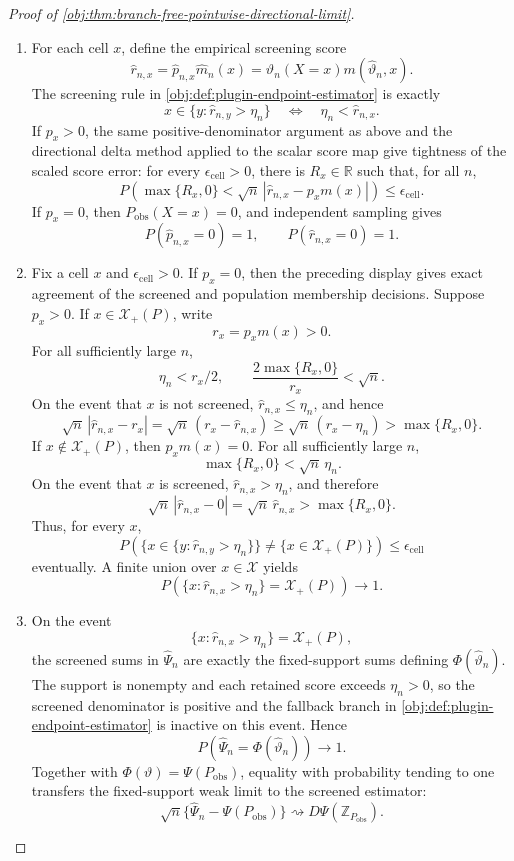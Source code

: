 \begin{proof}[Proof of \cref{obj:thm:branch-free-pointwise-directional-limit}]
\begin{enumerate}
\item For each cell \(x\), define the empirical screening score
\[
\widehat r_{n,x}
=
\widehat p_{n,x}\widehat m_n(x)
=
\widehat\vartheta_n(X=x)m(\widehat\vartheta_n,x).
\]
The screening rule in \cref{obj:def:plugin-endpoint-estimator} is exactly
\[
x\in\{y:\widehat r_{n,y}>\eta_n\}
\quad\Longleftrightarrow\quad
\eta_n<\widehat r_{n,x}.
\]
If \(p_x>0\), the same positive-denominator argument as above and the directional delta method applied to the scalar score map give tightness of the scaled score error: for every \(\epsilon_{\mathrm{cell}}>0\), there is \(R_x\in\mathbb R\) such that, for all \(n\),
\[
P\!\left(
\max\{R_x,0\}
<
\sqrt n\,|\widehat r_{n,x}-p_xm(x)|
\right)
\le \epsilon_{\mathrm{cell}} .
\]
If \(p_x=0\), then \(P_{\mathrm{obs}}(X=x)=0\), and independent sampling gives
\[
P(\widehat p_{n,x}=0)=1,
\qquad
P(\widehat r_{n,x}=0)=1 .
\]

\item Fix a cell \(x\) and \(\epsilon_{\mathrm{cell}}>0\). If \(p_x=0\), then the preceding display gives exact agreement of the screened and population membership decisions. Suppose \(p_x>0\). If \(x\in\mathcal X_+(P)\), write
\[
r_x=p_xm(x)>0 .
\]
For all sufficiently large \(n\),
\[
\eta_n<r_x/2,
\qquad
\frac{2\max\{R_x,0\}}{r_x}<\sqrt n .
\]
On the event that \(x\) is not screened, \(\widehat r_{n,x}\le\eta_n\), and hence
\[
\sqrt n\,|\widehat r_{n,x}-r_x|
=
\sqrt n\,(r_x-\widehat r_{n,x})
\ge
\sqrt n\,(r_x-\eta_n)
>
\max\{R_x,0\}.
\]
If \(x\notin\mathcal X_+(P)\), then \(p_xm(x)=0\). For all sufficiently large \(n\),
\[
\max\{R_x,0\}<\sqrt n\,\eta_n .
\]
On the event that \(x\) is screened, \(\widehat r_{n,x}>\eta_n\), and therefore
\[
\sqrt n\,|\widehat r_{n,x}-0|
=
\sqrt n\,\widehat r_{n,x}
>
\max\{R_x,0\}.
\]
Thus, for every \(x\),
\[
P\!\left(
\{x\in\{y:\widehat r_{n,y}>\eta_n\}\}
\ne
\{x\in\mathcal X_+(P)\}
\right)
\le \epsilon_{\mathrm{cell}}
\]
eventually. A finite union over \(x\in\mathcal X\) yields
\[
P\!\left(\{x:\widehat r_{n,x}>\eta_n\}=\mathcal X_+(P)\right)\to1.
\]

\item On the event
\[
\{x:\widehat r_{n,x}>\eta_n\}=\mathcal X_+(P),
\]
the screened sums in \(\widehat\Psi_n\) are exactly the fixed-support sums defining \(\Phi(\widehat\vartheta_n)\). The support is nonempty and each retained score exceeds \(\eta_n>0\), so the screened denominator is positive and the fallback branch in \cref{obj:def:plugin-endpoint-estimator} is inactive on this event. Hence
\[
P\!\left(
\widehat\Psi_n=\Phi(\widehat\vartheta_n)
\right)\to1 .
\]
Together with \(\Phi(\vartheta)=\Psi(P_{\mathrm{obs}})\), equality with probability tending to one transfers the fixed-support weak limit to the screened estimator:
\[
\sqrt n\{\widehat\Psi_n-\Psi(P_{\mathrm{obs}})\}
\rightsquigarrow
D\Psi(\mathbb Z_{P_{\mathrm{obs}}}).
\]


\end{enumerate}
\end{proof}
